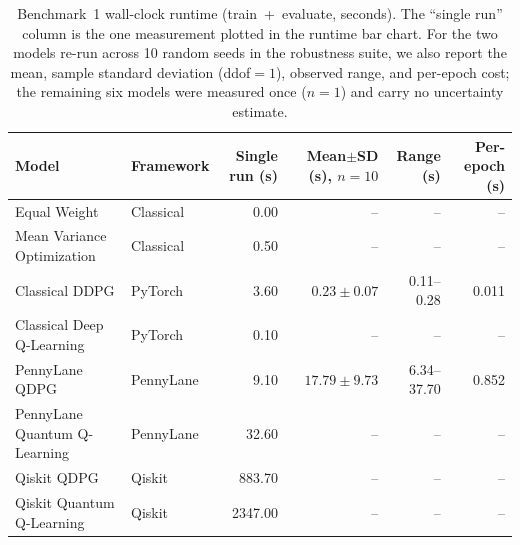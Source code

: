 
\begin{table}[t]
  \centering
  \caption{Benchmark~1 wall-clock runtime (train~+~evaluate, seconds).
    The ``single run'' column is the one measurement plotted in the
    runtime bar chart. For the two models re-run across 10 random seeds
    in the robustness suite, we also report the mean, sample standard
    deviation (ddof${=}1$), observed range, and per-epoch cost; the
    remaining six models were measured once ($n{=}1$) and carry no
    uncertainty estimate.}
  \label{tab:runtime}
  \begin{tabular}{llrrrr}
    \toprule
    Model & Framework & Single run (s) & Mean$\pm$SD (s), $n{=}10$ & Range (s) & Per-epoch (s) \\
    \midrule
    Equal Weight                  & Classical & 0.00    & --              & --            & -- \\
    Mean Variance Optimization    & Classical & 0.50    & --              & --            & -- \\
    Classical DDPG                & PyTorch   & 3.60    & $0.23\pm0.07$   & 0.11--0.28    & 0.011 \\
    Classical Deep Q-Learning     & PyTorch   & 0.10    & --              & --            & -- \\
    PennyLane QDPG                & PennyLane & 9.10    & $17.79\pm9.73$  & 6.34--37.70   & 0.852 \\
    PennyLane Quantum Q-Learning  & PennyLane & 32.60   & --              & --            & -- \\
    Qiskit QDPG                   & Qiskit    & 883.70  & --              & --            & -- \\
    Qiskit Quantum Q-Learning     & Qiskit    & 2347.00 & --              & --            & -- \\
    \bottomrule
  \end{tabular}
\end{table}


